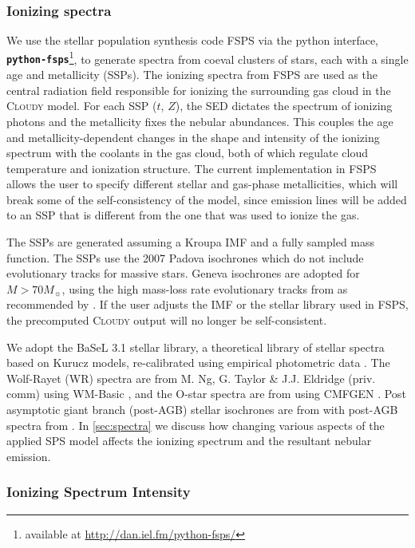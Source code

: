 \documentclass[twocolumn, tighten]{aastex61}
\newcommand{\Sec}[1]{\autoref{sec:#1}}
\newcommand{\FSPS}{{\sc FSPS}\xspace}
\newcommand{\pFSPS}{{\tt \textbf{python-fsps}}\xspace}
\newcommand{\Cloudy}{\textsc{Cloudy}\xspace}
\begin{document}
\subsubsection{Ionizing spectra}\label{sec:methods:cloudy:spectra}

We use the stellar population synthesis code \FSPS via the python interface, \pFSPS\footnote{available at \url{http://dan.iel.fm/python-fsps/}}, to generate spectra from coeval clusters of stars, each with a single age and metallicity (SSPs). The ionizing spectra from \FSPS are used as the central radiation field responsible for ionizing the surrounding gas cloud in the \Cloudy model. For each SSP ($t$, $Z$), the SED dictates the spectrum of ionizing photons and the metallicity fixes the nebular abundances. This couples the age and metallicity-dependent changes in the shape and intensity of the ionizing spectrum with the coolants in the gas cloud, both of which regulate cloud temperature and ionization structure. The current implementation in \FSPS allows the user to specify different stellar and gas-phase metallicities, which will break some of the self-consistency of the model, since emission lines will be added to an SSP that is different from the one that was used to ionize the gas.

The SSPs are generated assuming a Kroupa IMF \citep{Kroupa01} and a fully sampled mass function. The SSPs use the 2007 Padova isochrones \citep{Bertelli94, Girardi00, Marigo08} which do not include evolutionary tracks for massive stars. Geneva isochrones are adopted for $M > 70 M_{\sun}$, using the high mass-loss rate evolutionary tracks from \citep{Schaller92, Meynet00} as recommended by \citet{Levesque10}. If the user adjusts the IMF or the stellar library used in \FSPS, the precomputed \Cloudy output will no longer be self-consistent.

We adopt the BaSeL 3.1 stellar library, a theoretical library of stellar spectra based on Kurucz models, re-calibrated using empirical photometric data \citep{BaSeL}. The Wolf-Rayet (WR) spectra are from M. Ng, G. Taylor \& J.J. Eldridge (priv. comm) using WM-Basic \citep{Pauldrach01}, and the O-star spectra are from \citet{Smith02} using CMFGEN \citep{HillierMiller}. Post asymptotic giant branch (post-AGB) stellar isochrones are from \citet{Vassiliadis} with post-AGB spectra from \citet{Rauch03}. In \Sec{spectra} we discuss how changing various aspects of the applied SPS model affects the ionizing spectrum and the resultant nebular emission.

\subsubsection{Ionizing Spectrum Intensity}\label{sec:methods:cloudy:intensity}
\end{document}

